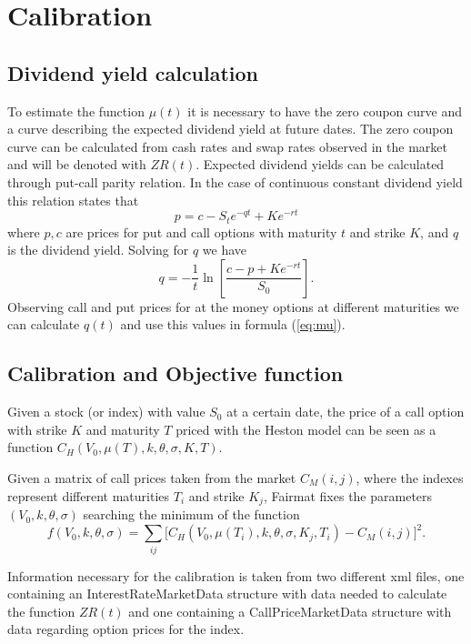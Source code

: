 \section{Calibration}

\subsection{Dividend yield calculation}

To estimate the function $\mu(t)$ it is necessary to have the zero coupon curve and a curve describing the expected dividend yield at future dates. The zero coupon curve can be calculated from cash rates and swap rates observed in the market and will be denoted with $ZR(t)$. Expected dividend yields can be calculated through put-call parity relation. In the case of continuous constant dividend yield this relation states that
\begin{equation}
p = c -S_te^{-qt} + Ke^{-rt}
\end{equation}
where $p,c$ are prices for put and call options with maturity $t$ and strike $K$, and $q$ is the dividend yield. Solving for $q$ we have
\begin{equation}
q = -\frac{1}{t}\ln\left[\frac{c-p + Ke^{-rt}}{S_0}\right].
\end{equation}
Observing call and put prices for at the money options at different maturities we can calculate $q(t)$ and use this values in formula (\ref{eq:mu}).

\subsection{Calibration and Objective function}

Given a stock (or index) with value $S_0$ at a certain date, the price of a call option with strike $K$ and maturity $T$ priced with the Heston model can be seen as a function $C_H(V_0, \mu(T), k, \theta, \sigma, K, T)$.

Given a matrix of call prices taken from the market $C_M(i,j)$, where the indexes represent different maturities $T_i$ and strike $K_j$, Fairmat fixes the parameters $(V_0, k, \theta, \sigma)$ searching the minimum of the function
\begin{equation}
f(V_0, k, \theta, \sigma) = \sum_{ij}\Big[C_H(V_0, \mu(T_i), k, \theta, \sigma, K_j, T_i) - C_M(i,j)\Big]^2.
\end{equation}

Information necessary for the calibration is taken from two different xml files, one containing an InterestRateMarketData  structure with data needed to calculate the function $ZR(t)$ and one containing a CallPriceMarketData structure with data regarding option prices for the index.

